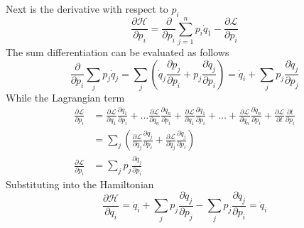 \documentclass[../../../main.tex]{subfiles}
\begin{document}
Next is the derivative with respect to $p_i$
\begin{equation*}
	\frac{\partial \mathcal{H}}{\partial p_i}=\frac{\partial}{\partial p_i}\sum_{j=1}^{n}p_i\dot{q}_1-\frac{\partial \mathcal{L}}{\partial p_i}
\end{equation*}
The sum differentiation can be evaluated as follows
\begin{equation*}
	\frac{\partial}{\partial p_i}\sum_{j}p_j\dot{q}_j=\sum_j\left(\dot{q}_j\frac{\partial p_j}{\partial p_i}+p_j\frac{\partial\dot{q}_j}{\partial p_i}\right)=\dot{q}_i+\sum_jp_j\frac{\partial \dot{q}_j}{\partial p_j}
\end{equation*}
While the Lagrangian term
\begin{align*}
	\frac{\partial \mathcal{L}}{\partial p_i} & =\frac{\partial \mathcal{L}}{\partial q_1}\frac{\partial q_1}{\partial p_i}+\dots\frac{\partial\mathcal{L}}{\partial q_n}\frac{\partial q_n}{\partial p_i}+\frac{\partial\mathcal{L}}{\partial \dot{q}_1}\frac{\partial\dot{q}_1}{\partial p_i}+\dots+\frac{\partial \mathcal{L}}{\partial \dot{q}_n}\frac{\partial \dot{q}_n}{\partial p_i}+\frac{\partial\mathcal{L}}{\partial t}\frac{\partial t}{\partial p_i} \\
	                                          & =\sum_j\left(\frac{\partial\mathcal{L}}{\partial q_j}\frac{\partial q_j}{\partial p_i}+\frac{\partial\mathcal{L}}{\partial \dot{q}_j}\frac{\partial \dot{q}_j}{\partial p_i}\right)                                                                                                                                                                                                                                      \\
	\frac{\partial \mathcal{L}}{\partial p_i} & =\sum_jp_j\frac{\partial \dot{q}_j}{\partial p_i}
\end{align*}
Substituting into the Hamiltonian
\begin{equation*}
	\frac{\partial \mathcal{H}}{\partial q_i}=\dot{q}_i+\sum_jp_j\frac{\partial \dot{q}_j}{\partial p_j}-\sum_jp_j\frac{\partial \dot{q}_j}{\partial p_i}=\dot{q}_i
\end{equation*}
\end{document}
